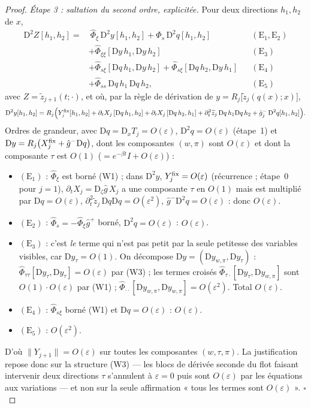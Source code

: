 \documentclass[11pt,a4paper]{article}
\theoremstyle{remark}
\theoremstyle{definition}
\newcommand{\norm}[1]{\lVert #1\rVert}
\newcommand{\eps}{\varepsilon}
\newcommand{\zt}{\widetilde z}
\newcommand{\D}{\mathrm D}
\begin{document}
\begin{proof}
\emph{Étape 3 : saltation du second ordre, explicitée.} Pour deux directions $h_1,h_2$ de $x$,
\[
\begin{aligned}
\D^2Z[h_1,h_2]={}&\ \hat\Phi_\xi\,\D^2y[h_1,h_2]+\hat\Phi_s\,\D^2q[h_1,h_2] &&(\mathrm{E}_1,\mathrm{E}_2)\\
&+\hat\Phi_{\xi\xi}[\D y\,h_1,\D y\,h_2] &&(\mathrm{E}_3)\\
&+\hat\Phi_{s\xi}[\D q\,h_1,\D y\,h_2]+\hat\Phi_{s\xi}[\D q\,h_2,\D y\,h_1] &&(\mathrm{E}_4)\\
&+\hat\Phi_{ss}\,\D q\,h_1\,\D q\,h_2, &&(\mathrm{E}_5)
\end{aligned}
\]
avec $Z=\zt_{j+1}(t;\cdot)$, et où, par la règle de dérivation de $y=R_j\bigl[\zt_j(q(x);x)\bigr]$,
\[
\D^2y[h_1,h_2]=R_j\Bigl(Y^{\rm fix}_j[h_1,h_2]+\partial_tX_j\,[\D q\,h_1,h_2]+\partial_tX_j\,[\D q\,h_2,h_1]+\partial_t^2\zt_j\,\D q\,h_1\D q\,h_2+\hat g^-_j\,\D^2q[h_1,h_2]\Bigr).
\]
Ordres de grandeur, avec $\D q=\D_xT_j=O(\eps)$, $\D^2q=O(\eps)$ (étape~1) et $\D y=R_j\bigl(X^{\rm fix}_j+\hat g^-\D q\bigr)$, dont les composantes $(w,\pi)$ sont $O(\eps)$ et dont la composante $\tau$ est $O(1)$ ($=e^{-\beta t}I+O(\eps)$) :
\begin{itemize}[nosep]
\item $(\mathrm E_1)$ : $\hat\Phi_\xi$ est borné (W1) ; dans $\D^2y$, $Y^{\rm fix}_j=O(\eps)$ (récurrence ; étape~0 pour $j=1$), $\partial_tX_j=\D_\zeta\hat g\,X_j$ a une composante $\tau$ en $O(1)$ mais est multiplié par $\D q=O(\eps)$, $\partial_t^2\zt_j\,\D q\D q=O(\eps^2)$, $\hat g^-\D^2q=O(\eps)$ : donc $O(\eps)$.
\item $(\mathrm E_2)$ : $\hat\Phi_s=-\hat\Phi_\xi\hat g^+$ borné, $\D^2q=O(\eps)$ : $O(\eps)$.
\item $(\mathrm E_3)$ : c'est \emph{le} terme qui n'est pas petit par la seule petitesse des variables visibles, car $\D y_\tau=O(1)$. On décompose $\D y=(\D y_{w,\pi},\D y_\tau)$ : $\hat\Phi_{\tau\tau}[\D y_\tau,\D y_\tau]=O(\eps)$ par (W3) ; les termes croisés $\hat\Phi_{\tau\cdot}[\D y_\tau,\D y_{w,\pi}]$ sont $O(1)\cdot O(\eps)$ par (W1) ; $\hat\Phi_{\cdot\cdot}[\D y_{w,\pi},\D y_{w,\pi}]=O(\eps^2)$. Total $O(\eps)$.
\item $(\mathrm E_4)$ : $\hat\Phi_{s\xi}$ borné (W1) et $\D q=O(\eps)$ : $O(\eps)$.
\item $(\mathrm E_5)$ : $O(\eps^2)$.
\end{itemize}
D'où $\norm{Y_{j+1}}=O(\eps)$ sur toutes les composantes $(w,\tau,\pi)$. La justification repose donc sur la structure (W3) --- les blocs de dérivée seconde du flot faisant intervenir deux directions $\tau$ s'annulent à $\eps=0$ puis sont $O(\eps)$ par les équations aux variations --- et non sur la seule affirmation « tous les termes sont $O(\eps)$ ». $\square$
\end{proof}
\end{document}
